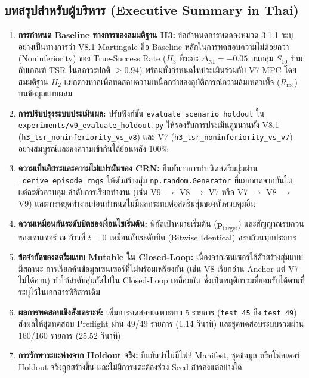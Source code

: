 \documentclass[10pt,a4paper]{article}
\begin{document}
\subsection{\texorpdfstring{บทสรุปสำหรับผู้บริหาร (Executive Summary in Thai)}{Executive Summary in Thai}}
{\thaifont\small
\begin{enumerate}
    \item \textbf{การกำหนด Baseline ทางการของสมมติฐาน H3:} ข้อกำหนดการทดลองหมวด 3.1.1 ระบุอย่างเป็นทางการว่า V8.1 Martingale คือ Baseline หลักในการทดสอบความไม่ด้อยกว่า (Noninferiority) ของ True-Success Rate ($H_3$ ที่ระยะ $\Delta_{\mathrm{NI}} = -0.05$ บนกลุ่ม $S_{10}$ ร่วมกับเกณฑ์ TSR ในสภาวะปกติ $\ge 0.94$) พร้อมทั้งกำหนดให้ประเมินร่วมกับ V7 MPC โดยสมมติฐาน $H_2$ แยกต่างหากเพื่อทดสอบความเหนือกว่าของอุบัติการณ์ความล้มเหลวเท็จ ($R_{\mathrm{inc}}$) บนข้อมูลแบบผสม
    \item \textbf{การปรับปรุงระบบประเมินผล:} ปรับฟังก์ชัน \texttt{evaluate\_scenario\_holdout} ใน \texttt{experiments/v9\_evaluate\_holdout.py} ให้รองรับการประเมินคู่ขนานทั้ง V8.1 (\texttt{h3\_tsr\_noninferiority\_vs\_v8}) และ V7 (\texttt{h3\_tsr\_noninferiority\_vs\_v7}) อย่างสมบูรณ์และคงความเข้ากันได้ย้อนหลัง 100\%
    \item \textbf{ความเป็นอิสระและความไม่แปรผันของ CRN:} ยืนยันว่าการกำเนิดสตรีมสุ่มผ่าน \texttt{\_derive\_episode\_rngs} ให้ตัวสร้างสุ่ม \texttt{np.random.Generator} ที่แยกขาดจากกันในแต่ละตัวควบคุม ลำดับการเรียกทำงาน (เช่น V9 $\to$ V8 $\to$ V7 หรือ V7 $\to$ V8 $\to$ V9) และการหยุดทำงานก่อนกำหนดไม่มีผลกระทบต่อสตรีมสุ่มของตัวควบคุมอื่น
    \item \textbf{ความเหมือนกันระดับบิตของเงื่อนไขเริ่มต้น:} พิกัดเป้าหมายเริ่มต้น ($\mathbf{p}_{\mathrm{target}}$) และสัญญาณรบกวนของเซนเซอร์ ณ ก้าวที่ $t=0$ เหมือนกันระดับบิต (Bitwise Identical) ครบถ้วนทุกประการ
    \item \textbf{ข้อจำกัดของสตรีมแบบ Mutable ใน Closed-Loop:} เนื่องจากเซนเซอร์ใช้ตัวสร้างสุ่มแบบมีสถานะ การเรียกค้นข้อมูลเซนเซอร์ที่ไม่พร้อมเพรียงกัน (เช่น V8 เรียกอ่าน Anchor แต่ V7 ไม่ได้อ่าน) ทำให้ลำดับสุ่มถัดไปใน Closed-Loop เหลื่อมกัน ซึ่งเป็นพฤติกรรมที่ยอมรับได้ตามที่ระบุไว้ในเอกสารพิธีสารเดิม
    \item \textbf{ผลการทดสอบเชิงสังเคราะห์:} เพิ่มการทดสอบเฉพาะทาง 5 รายการ (\texttt{test\_45} ถึง \texttt{test\_49}) ส่งผลให้ชุดทดสอบ Preflight ผ่าน 49/49 รายการ (1.14 วินาที) และชุดทดสอบระบบรวมผ่าน 160/160 รายการ (25.52 วินาที)
    \item \textbf{การรักษาระยะห่างจาก Holdout จริง:} ยืนยันว่าไม่มีไฟล์ Manifest, ชุดข้อมูล หรือโฟลเดอร์ Holdout จริงถูกสร้างขึ้น และไม่มีการแตะต้องช่วง Seed สำรองแต่อย่างใด
\end{enumerate}
}
\end{document}
